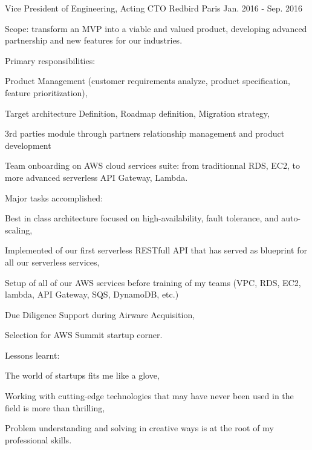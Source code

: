 \begin{cventries}
  \cventry
    {Vice President of Engineering, Acting CTO} %
    {Redbird} %
    {Paris} %
    {Jan. 2016 - Sep. 2016} %
    {
      \begin{cvitems} %
        \item {Scope: transform an MVP into a viable and valued product, developing advanced partnership and new features for our industries.}
        \item {Primary responsibilities:} %
        \begin{cvsubitems}
          \item {Product Management (customer requirements analyze, product specification, feature prioritization),}
          \item {Target architecture Definition, Roadmap definition, Migration strategy,}
          \item {3rd parties module through partners relationship management and product development}
          \item {Team onboarding on AWS cloud services suite: from traditionnal RDS, EC2, to more advanced serverless API Gateway, Lambda.}
        \end{cvsubitems}
        \item {Major tasks accomplished:}
        \begin{cvsubitems}
          \item {Best in class architecture focused on high-availability, fault tolerance, and auto-scaling,}
          \item {Implemented of our first serverless RESTfull API that has served as blueprint for all our serverless services,}
          \item {Setup of all of our AWS services before training of my teams (VPC, RDS, EC2, lambda, API Gateway, SQS, DynamoDB, etc.)}
          \item {Due Diligence Support during Airware Acquisition,}
          \item {Selection for AWS Summit startup corner.}
        \end{cvsubitems}
        \item {Lessons learnt:}
        \begin{cvsubitems}
          \item {The world of startups fits me like a glove,}
          \item {Working with cutting-edge technologies that may have never been used in the field is more than thrilling,}
          \item {Problem understanding and solving in creative ways is at the root of my professional skills.}
        \end{cvsubitems}
      \end{cvitems}
    }


\end{cventries}
